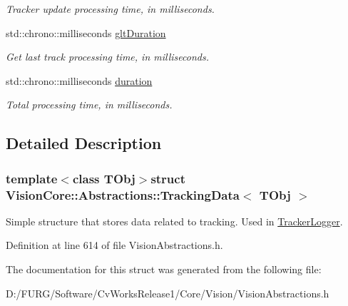 \begin{DoxyCompactItemize}
\begin{DoxyCompactList}\small\item\em Tracker update processing time, in milliseconds. \end{DoxyCompactList}\item 
\hypertarget{struct_vision_core_1_1_abstractions_1_1_tracking_data_ae22cad4c6d0a00d3e063b94222214f03}{}std\+::chrono\+::milliseconds \hyperlink{struct_vision_core_1_1_abstractions_1_1_tracking_data_ae22cad4c6d0a00d3e063b94222214f03}{glt\+Duration}\label{struct_vision_core_1_1_abstractions_1_1_tracking_data_ae22cad4c6d0a00d3e063b94222214f03}

\begin{DoxyCompactList}\small\item\em Get last track processing time, in milliseconds. \end{DoxyCompactList}\item 
\hypertarget{struct_vision_core_1_1_abstractions_1_1_tracking_data_a9c26a1638f116d3c0fba3f9342d67af1}{}std\+::chrono\+::milliseconds \hyperlink{struct_vision_core_1_1_abstractions_1_1_tracking_data_a9c26a1638f116d3c0fba3f9342d67af1}{duration}\label{struct_vision_core_1_1_abstractions_1_1_tracking_data_a9c26a1638f116d3c0fba3f9342d67af1}

\begin{DoxyCompactList}\small\item\em Total processing time, in milliseconds. \end{DoxyCompactList}\end{DoxyCompactItemize}


\subsection{Detailed Description}
\subsubsection*{template$<$class T\+Obj$>$struct Vision\+Core\+::\+Abstractions\+::\+Tracking\+Data$<$ T\+Obj $>$}

Simple structure that stores data related to tracking. Used in \hyperlink{class_vision_core_1_1_abstractions_1_1_tracker_logger}{Tracker\+Logger}. 

Definition at line 614 of file Vision\+Abstractions.\+h.



The documentation for this struct was generated from the following file\+:\begin{DoxyCompactItemize}
\item 
D\+:/\+F\+U\+R\+G/\+Software/\+Cv\+Works\+Release1/\+Core/\+Vision/Vision\+Abstractions.\+h\end{DoxyCompactItemize}
